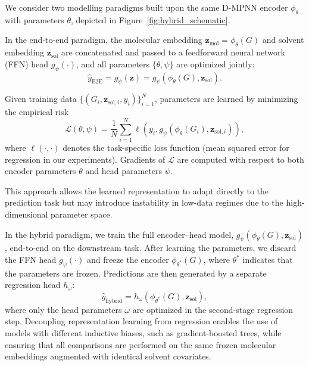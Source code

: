 We consider two modelling paradigms built upon the same D-MPNN encoder $\phi_{\theta}$ with parameters $\theta$, depicted in Figure~\ref{fig:hybrid_schematic}.

In the end-to-end paradigm, the molecular embedding $\mathbf z_{\mathrm{mol}} = \phi_\theta(G)
$ and solvent embedding $\mathbf z_{\mathrm{sol}}$ are concatenated and passed to a feedforward neural network (FFN) head $g_{\psi}(\cdot)$, and all parameters $\{\theta, \psi\}$ are optimized jointly:
\begin{equation}
\hat{y}_{\text{E2E}} = g_\psi(\mathbf z)
= g_{\psi}(\phi_{\theta}(G), \mathbf z_{\mathrm{sol}}).
\end{equation}

Given training data $\{(G_i,\mathbf z_{\mathrm{sol},i},y_i)\}_{i=1}^N$, parameters are learned by minimizing the empirical risk
\begin{equation}
\mathcal{L}(\theta,\psi)
=
\frac{1}{N} \sum_{i=1}^{N}
\ell\!\left(
y_i,
g_{\psi}(\phi_{\theta}(G_i), \mathbf z_{\mathrm{sol},i})
\right),
\end{equation}
where $\ell(\cdot,\cdot)$ denotes the task-specific loss function (mean squared error for regression in our experiments). Gradients of $\mathcal{L}$ are computed with respect to both encoder parameters $\theta$ and head parameters $\psi$.

This approach allows the learned representation to adapt directly to the prediction task but may introduce instability in low-data regimes due to the high-dimensional parameter space.

In the hybrid paradigm, we train the full encoder--head model, $g_{\psi}(\phi_{\theta}(G),\mathbf z_{\mathrm{sol}})$, end-to-end on the downstream task. After learning the parameters, we discard the FFN head $g_{\psi}(\cdot)$ and freeze the encoder $\phi_{\theta^*}(G)$, where $\theta^*$ indicates that the parameters are frozen. Predictions are then generated by a separate regression head $h_{\omega}$:
\begin{equation}
\hat{y}_{\text{hybrid}} = h_{\omega}(\phi_{\theta^*}(G),\mathbf z_{\mathrm{sol}}),
\end{equation}
where only the head parameters $\omega$ are optimized in the second-stage regression step. Decoupling representation learning from regression enables the use of models with different inductive biases, such as gradient-boosted trees, while ensuring that all comparisons are performed on the same frozen molecular embeddings augmented with identical solvent covariates.

